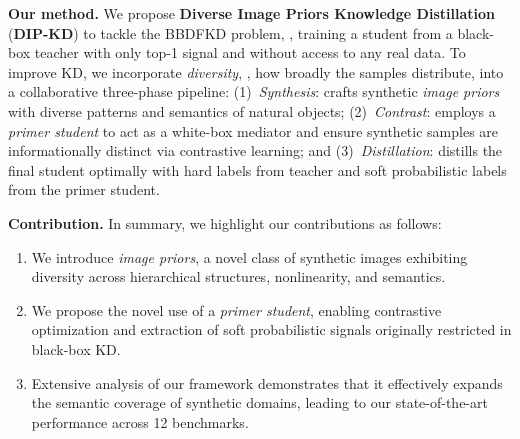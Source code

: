 \begin{foldable} %
  \textbf{Our method.} We propose \textbf{Diverse Image Priors Knowledge Distillation} (\textbf{DIP-KD}) to tackle the BBDFKD problem, \ie, training a student from a black-box teacher with only top-1 signal and without access to any real data.
  To improve KD, we incorporate \textit{diversity}, \ie, how broadly the samples distribute, into a collaborative three-phase pipeline:{
    (1)~\textit{Synthesis}: crafts synthetic \textit{image priors} with diverse patterns and semantics of natural objects;
    (2)~\textit{Contrast}: employs a \textit{primer student} to act as a white-box mediator and ensure synthetic samples are informationally distinct via contrastive learning;
    and (3)~\textit{Distillation}: distills the final student optimally with hard labels from teacher and soft probabilistic labels from the primer student.
  }
\end{foldable}

\begin{foldable} %
  \textbf{Contribution.} In summary, we highlight our contributions as follows:
  \begin{enumerate}
    \item We introduce \textit{image priors}, a novel class of synthetic images exhibiting diversity across hierarchical structures, nonlinearity, and semantics.
    \item We propose the novel use of a \textit{primer student}, enabling contrastive optimization and extraction of soft probabilistic signals originally restricted in black-box KD.
    \item Extensive analysis of our framework demonstrates that it effectively expands the semantic coverage of synthetic domains, leading to our state-of-the-art performance across 12 benchmarks.
  \end{enumerate}
\end{foldable}
